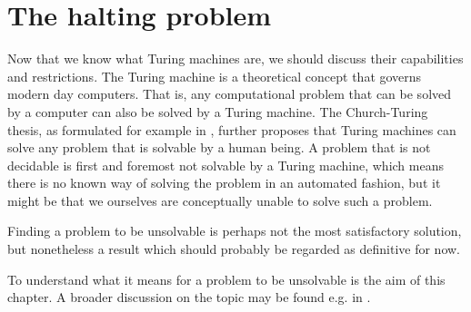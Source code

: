 \section{The halting problem}

Now that we know what Turing machines are, we should discuss their capabilities and restrictions.
The Turing machine is a theoretical concept that governs modern day computers. That is, any computational problem that can be solved by a computer can also be solved by a Turing machine.
The Church-Turing thesis, as formulated for example in \cite{tur36}, further proposes that Turing machines can solve any problem that is solvable by a human being.
A problem that is not decidable is first and foremost not solvable by a Turing machine, which means there is no known way of solving the problem in an automated fashion, but it might be that we ourselves are conceptually unable to solve such a problem.

Finding a problem to be unsolvable is perhaps not the most satisfactory solution, but nonetheless a result which should probably be regarded as definitive for now.

To understand what it means for a problem to be unsolvable is the aim of this chapter.
A broader discussion on the topic may be found e.g. in \cite{sip06}.






